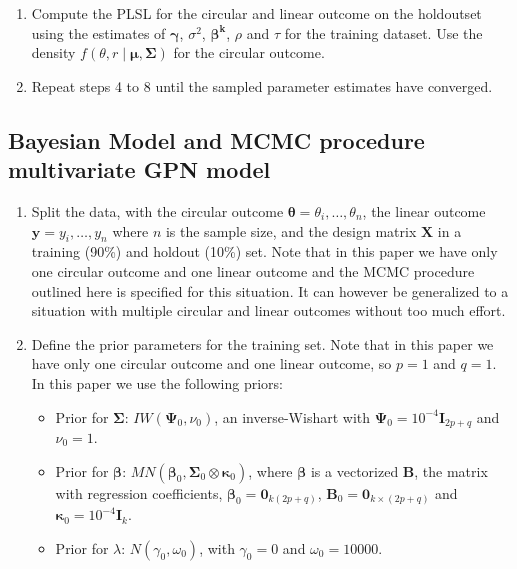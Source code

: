 \documentclass[11pt,]{article}
\begin{document}
\begin{appendices}
\begin{enumerate}
\begin{itemize}
\end{itemize}

\item Compute the PLSL for the circular and linear outcome on the holdoutset using the estimates of $\boldsymbol{\gamma}$, $\sigma^2$, $\boldsymbol{\beta^{k}}$, $\rho$ and $\tau$ for the training dataset. Use the density $f(\theta, r \mid \boldsymbol{\mu}, \boldsymbol{\Sigma})$ for the circular outcome.

\item Repeat steps 4 to 8 until the sampled parameter estimates have converged.

\end{enumerate}





\newpage
\subsection{Bayesian Model and MCMC procedure multivariate GPN model}\label{A3}

\begin{enumerate}
\item Split the data, with the circular outcome $\boldsymbol{\theta} = \theta_i, \dots, \theta_n$, the linear outcome $\boldsymbol{y} = y_i, \dots, y_n$ where $n$ is the sample size, and the design matrix $\boldsymbol{X}$ in a training (90\%) and holdout (10\%) set. Note that in this paper we have only one circular outcome and one linear outcome and the MCMC procedure outlined here is specified for this situation. It can however be generalized to a situation with multiple circular and linear outcomes without too much effort. 

\item Define the prior parameters for the training set. Note that in this paper we have only one circular outcome and one linear outcome, so $p = 1$ and $q = 1$. In this paper we use the following priors:

\begin{itemize}
\item Prior for $\boldsymbol{\Sigma}$: $IW(\boldsymbol{\Psi}_0, \nu_0)$, an inverse-Wishart with $\boldsymbol{\Psi}_0 = 10^{-4}\boldsymbol{I}_{2p + q}$ and $\nu_0 = 1$.   
\item Prior for $\boldsymbol{\beta}$: $MN(\boldsymbol{\beta}_0, \boldsymbol{\Sigma}_0  \otimes \boldsymbol{\kappa}_0)$, where $\boldsymbol{\beta}$ is a vectorized $\boldsymbol{B}$, the matrix with regression coefficients, $\boldsymbol{\beta}_0 = \boldsymbol{0}_{k(2p + q)}$, $\boldsymbol{B}_0 = \boldsymbol{0}_{k \times (2p + q)}$ and $\boldsymbol{\kappa}_0 = 10^{-4}\boldsymbol{I}_k$.
\item Prior for $\lambda$: $N(\gamma_0, \omega_0)$, with $\gamma_0 = 0$ and $\omega_0 = 10000$.
\end{itemize}


\end{enumerate}
\end{appendices}
\end{document}
